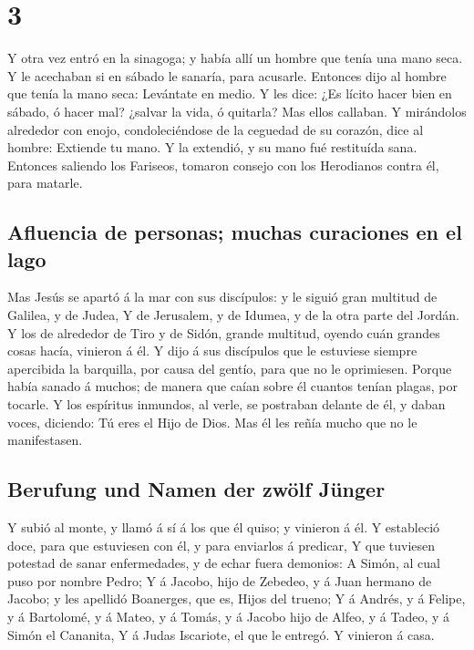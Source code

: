 \hypertarget{section-2}{%
\section{3}\label{section-2}}

 Y otra vez entró en la sinagoga; y había allí un hombre
que tenía una mano seca.  Y le acechaban si en sábado le
sanaría, para acusarle.  Entonces dijo al hombre que tenía
la mano seca: Levántate en medio.  Y les dice: ¿Es lícito
hacer bien en sábado, ó hacer mal? ¿salvar la vida, ó quitarla? Mas
ellos callaban.  Y mirándolos alrededor con enojo,
condoleciéndose de la ceguedad de su corazón, dice al hombre: Extiende
tu mano. Y la extendió, y su mano fué restituída sana. 
Entonces saliendo los Fariseos, tomaron consejo con los Herodianos
contra él, para matarle.

\hypertarget{afluencia-de-personas-muchas-curaciones-en-el-lago}{%
\subsection{Afluencia de personas; muchas curaciones en el
lago}\label{afluencia-de-personas-muchas-curaciones-en-el-lago}}

 Mas Jesús se apartó á la mar con sus discípulos: y le
siguió gran multitud de Galilea, y de Judea,  Y de
Jerusalem, y de Idumea, y de la otra parte del Jordán. Y los de
alrededor de Tiro y de Sidón, grande multitud, oyendo cuán grandes cosas
hacía, vinieron á él.  Y dijo á sus discípulos que le
estuviese siempre apercibida la barquilla, por causa del gentío, para
que no le oprimiesen.  Porque había sanado á muchos; de
manera que caían sobre él cuantos tenían plagas, por tocarle.
 Y los espíritus inmundos, al verle, se postraban delante
de él, y daban voces, diciendo: Tú eres el Hijo de Dios. 
Mas él les reñía mucho que no le manifestasen.

\hypertarget{berufung-und-namen-der-zwuxf6lf-juxfcnger}{%
\subsection{Berufung und Namen der zwölf
Jünger}\label{berufung-und-namen-der-zwuxf6lf-juxfcnger}}

 Y subió al monte, y llamó á sí á los que él quiso; y
vinieron á él.  Y estableció doce, para que estuviesen
con él, y para enviarlos á predicar,  Y que tuviesen
potestad de sanar enfermedades, y de echar fuera demonios:
 A Simón, al cual puso por nombre Pedro; 
Y á Jacobo, hijo de Zebedeo, y á Juan hermano de Jacobo; y les apellidó
Boanerges, que es, Hijos del trueno;  Y á Andrés, y á
Felipe, y á Bartolomé, y á Mateo, y á Tomás, y á Jacobo hijo de Alfeo, y
á Tadeo, y á Simón el Cananita,  Y á Judas Iscariote, el
que le entregó. Y vinieron á casa.

